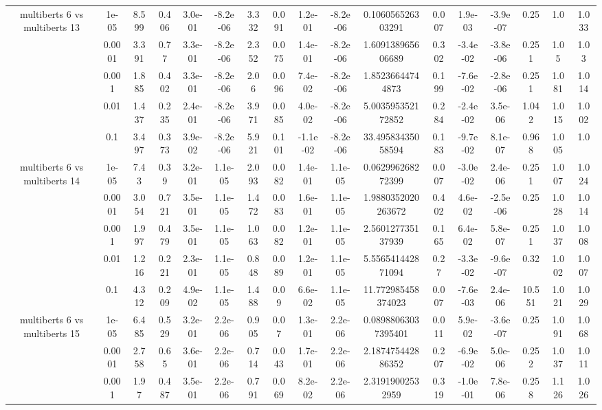 \begin{tabular}{|c|c|c|c|c|c|c|c|c|c|c|c|c|c|c|c|c|}
\hline
\multirow{5}{*}{multiberts 6 vs multiberts 13} & 1e-05 & 8.599 & 0.406 & 3.0e-01 & -8.2e-06 & 3.332 & 0.091 & 1.2e-01 & -8.2e-06 & 0.106056526303291 & 0.007 & 1.9e-03 & -3.9e-07 & 0.25 & 1.0 & 1.033 \\
 & 0.0001 & 3.391 & 0.77 & 3.3e-01 & -8.2e-06 & 2.352 & 0.075 & 1.4e-01 & -8.2e-06 & 1.609138965606689 & 0.302 & -3.4e-02 & -3.8e-06 & 0.251 & 1.05 & 1.03 \\
 & 0.001 & 1.885 & 0.402 & 3.3e-01 & -8.2e-06 & 2.06 & 0.096 & 7.4e-02 & -8.2e-06 & 1.85236644744873 & 0.199 & -7.6e-02 & -2.8e-06 & 0.251 & 1.081 & 1.014 \\
 & 0.01 & 1.437 & 0.235 & 2.4e-01 & -8.2e-06 & 3.971 & 0.085 & 4.0e-02 & -8.2e-06 & 5.003595352172852 & 0.284 & -2.4e-02 & 3.5e-06 & 1.042 & 1.015 & 1.002 \\
 & 0.1 & 3.497 & 0.373 & 3.9e-02 & -8.2e-06 & 5.921 & 0.101 & -1.1e-02 & -8.2e-06 & 33.49583435058594 & 0.183 & -9.7e-02 & 8.1e-07 & 0.968 & 1.005 & 1.0 \\
\hline
\multirow{5}{*}{multiberts 6 vs multiberts 14} & 1e-05 & 7.43 & 0.39 & 3.2e-01 & 1.1e-05 & 2.093 & 0.082 & 1.4e-01 & 1.1e-05 & 0.062996268272399 & 0.007 & -3.0e-02 & 2.4e-06 & 0.251 & 1.007 & 1.024 \\
 & 0.0001 & 3.054 & 0.721 & 3.5e-01 & 1.1e-05 & 1.472 & 0.083 & 1.6e-01 & 1.1e-05 & 1.9880352020263672 & 0.402 & 4.6e-02 & -2.5e-06 & 0.25 & 1.028 & 1.014 \\
 & 0.001 & 1.997 & 0.479 & 3.5e-01 & 1.1e-05 & 1.063 & 0.082 & 1.2e-01 & 1.1e-05 & 2.560127735137939 & 0.165 & 6.4e-02 & 5.8e-07 & 0.251 & 1.037 & 1.008 \\
 & 0.01 & 1.216 & 0.221 & 2.3e-01 & 1.1e-05 & 0.848 & 0.089 & 1.2e-01 & 1.1e-05 & 5.556541442871094 & 0.27 & -3.3e-02 & -9.6e-07 & 0.32 & 1.002 & 1.007 \\
 & 0.1 & 4.312 & 0.209 & 4.9e-02 & 1.1e-05 & 1.488 & 0.09 & 6.6e-02 & 1.1e-05 & 11.772985458374023 & 0.007 & -7.6e-03 & 2.4e-06 & 10.551 & 1.021 & 1.029 \\
\hline
\multirow{5}{*}{multiberts 6 vs multiberts 15} & 1e-05 & 6.485 & 0.529 & 3.2e-01 & 2.2e-06 & 0.905 & 0.07 & 1.3e-01 & 2.2e-06 & 0.08988063037395401 & 0.011 & 5.9e-02 & -3.6e-07 & 0.25 & 1.091 & 1.068 \\
 & 0.0001 & 2.758 & 0.65 & 3.6e-01 & 2.2e-06 & 0.714 & 0.043 & 1.7e-01 & 2.2e-06 & 2.187475442886352 & 0.207 & -6.9e-02 & 5.0e-06 & 0.252 & 1.037 & 1.011 \\
 & 0.001 & 1.97 & 0.487 & 3.5e-01 & 2.2e-06 & 0.791 & 0.069 & 8.2e-02 & 2.2e-06 & 2.31919002532959 & 0.319 & -1.0e-01 & 7.8e-06 & 0.258 & 1.126 & 1.026 \\

\end{tabular}
